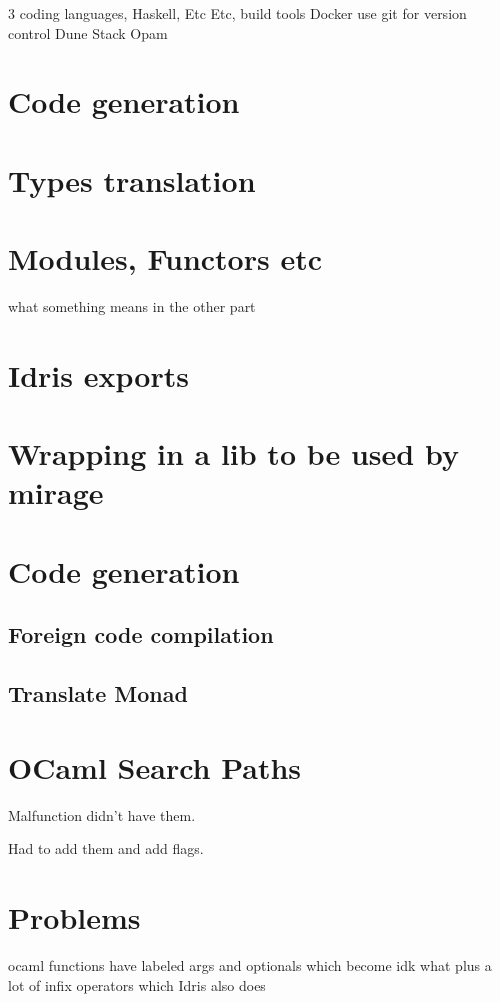 
3 coding languages, Haskell, Etc Etc, build tools Docker
use git for version control Dune Stack Opam 

\section{Code generation}




\section{Types translation}

\section{Modules, Functors etc}

what something means in the other part

\section{Idris exports}

\section{Wrapping in a lib to be used by mirage}

\section{Code generation}
\subsection{Foreign code compilation}
\subsection{Translate Monad}

\section{OCaml Search Paths}
Malfunction didn't have them. 

Had to add them and add flags.

\section{Problems}

ocaml functions have labeled args and optionals which become idk
what plus a lot of infix operators which Idris also does

